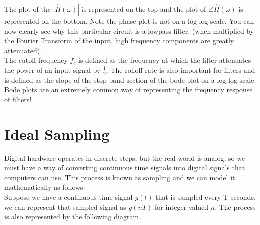 \documentclass[a4paper]{article}
\numberwithin{equation}{section}
\begin{document}
The plot of the  $|\hat{H}(\omega)|$ is represented on the top and the plot of $\angle \hat{H}(\omega)$ is represented on the bottom. Note the phase plot is not on a log log scale. You can now clearly see why this particular circuit is a lowpass filter, (when multiplied by the Fourier Transform of the input, high frequency components are greatly attenuated). \\

The cutoff frequency $f_c$ is defined as the frequency at which the filter attenuates the power of an input signal by $\frac{1}{2}$. The rolloff rate is also important for filters and is defined as the slope of the stop band section of the bode plot on a log log scale.\\

Bode plots are an extremely common way of representing the frequency response of filters!

\section{Ideal Sampling}
Digital hardware operates in discrete steps, but the real world is analog, so we must have a way of converting continuous time signals into digital signals that computers can use. This process is known as sampling and we can model it mathematically as follows:\\

Suppose we have a continuous time signal $y(t)$ that is sampled every T seconds, we can represent that sampled signal as $y(nT)$ for integer valued $n$. The process is also represented by the following diagram. 

\begin{center}
\end{center}
\end{document}
